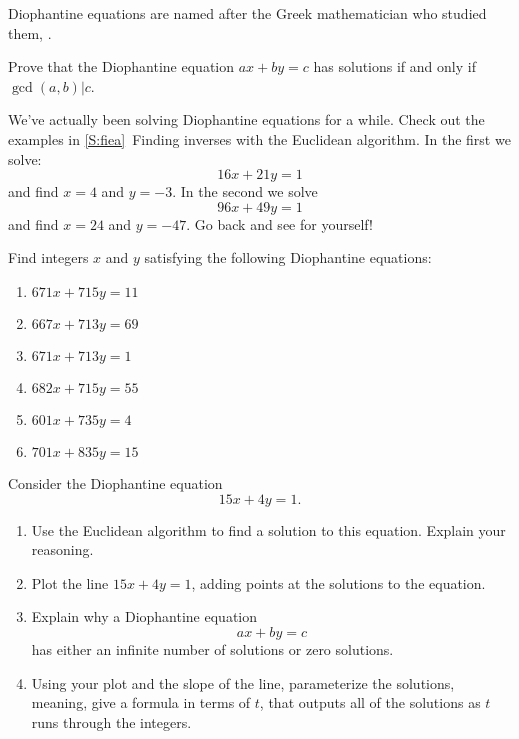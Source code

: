 \documentclass{ximera}
\begin{document}
Diophantine equations are named after the Greek mathematician who
studied them, .

\begin{exercise}
  Prove that the Diophantine equation $ax + by = c$ has solutions if
  and only if $\gcd(a,b)|c$.
\end{exercise}

We've actually been solving Diophantine equations for a while. Check
out the examples in \ref{S:fiea}~Finding inverses with the Euclidean
algorithm. In the first we solve:
\[
16x + 21y = 1
\]
and find $x=4$ and $y=-3$.  In the second we solve
\[
96x +49y =1
\]
and find $x=24$ and $y=-47$. Go back and see for yourself!

\begin{exercise}
  Find integers $x$ and $y$ satisfying the following Diophantine
  equations:
  \begin{enumerate}
  \item $671x + 715 y = 11$ 
  \item $667x + 713 y = 69$ 
  \item $671x + 713 y = 1$
  \item $682x + 715 y = 55$
  \item $601x + 735 y = 4$
  \item $701x + 835 y = 15$
  \end{enumerate}
\end{exercise}

\begin{exercise}
  Consider the Diophantine equation
  \[
  15x + 4y = 1.
  \]
  \begin{enumerate}
  \item Use the Euclidean algorithm to find a solution to this
    equation. Explain your reasoning.
  \item Plot the line $15x + 4y = 1$, adding points at the solutions
    to the equation.
  \item Explain why a Diophantine equation 
    \[
    ax + by = c
    \]
  has either an infinite number of solutions or zero solutions.
\item Using your plot and the slope of the line, parameterize the
  solutions, meaning, give a formula in terms of $t$, that outputs all
  of the solutions as $t$ runs through the integers.
  \end{enumerate}
\end{exercise}
\end{document}
